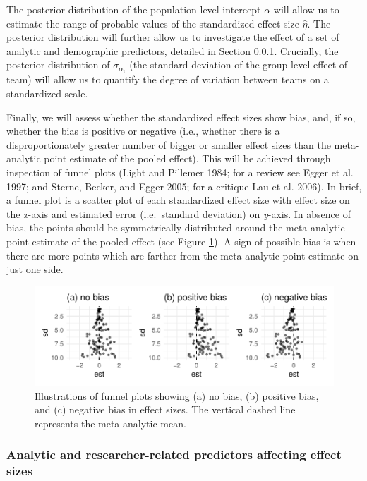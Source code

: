 \documentclass[
  12pt,
]{article}
\begin{document}
The posterior distribution of the population-level intercept \(\alpha\) will allow us to estimate the range of probable values of the standardized effect size \(\hat{\eta}\).
The posterior distribution will further allow us to investigate the effect of a set of analytic and demographic predictors, detailed in Section \ref{anares-preds}.
Crucially, the posterior distribution of \(\sigma_{\alpha_{\text{t}}}\) (the standard deviation of the group-level effect of team) will allow us to quantify the degree of variation between teams on a standardized scale.

Finally, we will assess whether the standardized effect sizes show bias, and, if so, whether the bias is positive or negative (i.e., whether there is a disproportionately greater number of bigger or smaller effect sizes than the meta-analytic point estimate of the pooled effect).
This will be achieved through inspection of funnel plots (Light and Pillemer 1984; for a review see Egger et al. 1997; and Sterne, Becker, and Egger 2005; for a critique Lau et al. 2006).
In brief, a funnel plot is a scatter plot of each standardized effect size with effect size on the \emph{x}-axis and estimated error (i.e.~standard deviation) on \emph{y}-axis.
In absence of bias, the points should be symmetrically distributed around the meta-analytic point estimate of the pooled effect (see Figure \ref{fig:funnel-plot}).
A sign of possible bias is when there are more points which are farther from the meta-analytic point estimate on just one side.

\begin{figure}
\centering
\includegraphics{Draft_RR_files/figure-latex/funnel-plot-1.pdf}
\caption{\label{fig:funnel-plot}Illustrations of funnel plots showing (a) no bias, (b) positive bias, and (c) negative bias in effect sizes. The vertical dashed line represents the meta-analytic mean.}
\end{figure}

\hypertarget{anares-preds}{%
\subsubsection{Analytic and researcher-related predictors affecting effect sizes}\label{anares-preds}}
\end{document}
